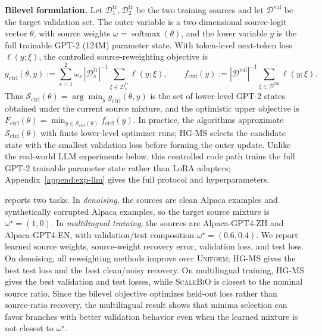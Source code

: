 \documentclass{article}
\theoremstyle{normaltheorem}
\newcommand{\calS}{\mathcal{S}}
\newcommand{\softmax}{\operatorname{softmax}}
\begin{document}
\textbf{Bilevel formulation.}
Let \(\mathcal D^{\mathrm{tr}}_1,\mathcal D^{\mathrm{tr}}_2\) be the two training sources and let
\(\mathcal D^{\mathrm{val}}\) be the target validation set. The outer variable is a two-dimensional source-logit vector
\(\theta\), with source weights \(\omega=\softmax(\theta)\), and the lower variable \(y\) is the full trainable GPT-2
(124M) parameter state. With token-level next-token loss \(\ell(y;\xi)\), the controlled source-reweighting objective is
\[
g_{\mathrm{ctrl}}(\theta,y)
:=
\sum_{s=1}^{2}\omega_s\,|\mathcal D^{\mathrm{tr}}_s|^{-1}
\sum_{\xi\in\mathcal D^{\mathrm{tr}}_s}\ell(y;\xi),
\qquad
f_{\mathrm{ctrl}}(y)
:=
|\mathcal D^{\mathrm{val}}|^{-1}
\sum_{\xi\in\mathcal D^{\mathrm{val}}}\ell(y;\xi).
\]
Thus \(\calS_{\mathrm{ctrl}}(\theta)=\arg\min_y g_{\mathrm{ctrl}}(\theta,y)\) is the set of lower-level GPT-2 states
obtained under the current source mixture, and the optimistic upper objective is
\(F_{\mathrm{ctrl}}(\theta)=\min_{y\in\calS_{\mathrm{ctrl}}(\theta)} f_{\mathrm{ctrl}}(y)\). In practice, the algorithms
approximate \(\calS_{\mathrm{ctrl}}(\theta)\) with finite lower-level optimizer runs; \textsc{HG-MS} selects the candidate
state with the smallest validation loss before forming the outer update. Unlike the real-world LLM experiments below, this
controlled code path trains the full GPT-2 trainable parameter state rather than LoRA adapters;
Appendix~\ref{append:exp-llm} gives the full protocol and hyperparameters.

 reports two tasks. In \emph{denoising}, the sources are clean Alpaca examples and synthetically
corrupted Alpaca examples, so the target source mixture is \(\omega^\star=(1,0)\). In \emph{multilingual training}, the
sources are Alpaca-GPT4-ZH and Alpaca-GPT4-EN, with validation/test composition
\(\omega^\star=(0.6,0.4)\). We report learned source weights, source-weight recovery error, validation loss, and test
loss. On denoising, all reweighting methods improve over \textsc{Uniform}; \textsc{HG-MS} gives the best test loss and
the best clean/noisy recovery. On multilingual training, \textsc{HG-MS} gives the best validation and test losses, while
\textsc{ScaleBiO} is closest to the nominal source ratio. Since the bilevel objective optimizes held-out loss rather than
source-ratio recovery, the multilingual result shows that minima selection can favor branches with better validation
behavior even when the learned mixture is not closest to \(\omega^\star\).
\end{document}
